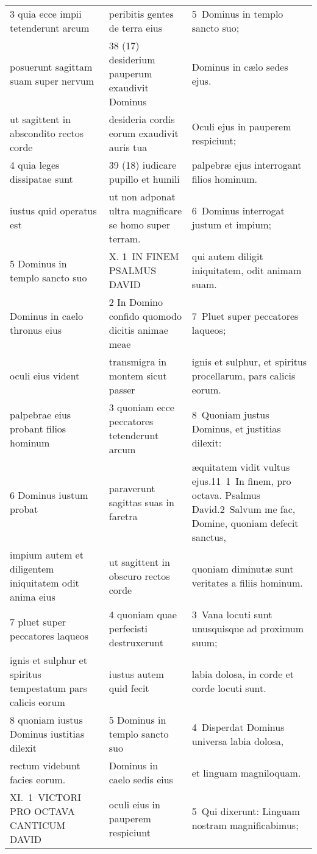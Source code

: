 \documentclass{article}
\begin{document}
\begin{longtable}{@{}p{}p{}p{}@{}}
3 quia ecce impii tetenderunt arcum	&	peribitis gentes de terra eius	&	5 Dominus in templo sancto suo;	\\
posuerunt sagittam suam super nervum	&	38 (17) desiderium pauperum exaudivit Dominus	&	Dominus in cælo sedes ejus.	\\
ut sagittent in abscondito rectos corde	&	desideria cordis eorum exaudivit auris tua	&	Oculi ejus in pauperem respiciunt;	\\
4 quia leges dissipatae sunt	&	39 (18) iudicare pupillo et humili	&	palpebræ ejus interrogant filios hominum.	\\
iustus quid operatus est	&	ut non adponat ultra magnificare se homo super terram.	&	6 Dominus interrogat justum et impium;	\\
5 Dominus in templo sancto suo	&	X. 1 IN FINEM PSALMUS DAVID	&	qui autem diligit iniquitatem, odit animam suam.	\\
Dominus in caelo thronus eius	&	2 In Domino confido quomodo dicitis animae meae	&	7 Pluet super peccatores laqueos;	\\
oculi eius vident	&	transmigra in montem sicut passer	&	ignis et sulphur, et spiritus procellarum, pars calicis eorum.	\\
palpebrae eius probant filios hominum	&	3 quoniam ecce peccatores tetenderunt arcum	&	8 Quoniam justus Dominus, et justitias dilexit:	\\
6 Dominus iustum probat	&	paraverunt sagittas suas in faretra	&	æquitatem vidit vultus ejus.11 1 In finem, pro octava. Psalmus David.2 Salvum me fac, Domine, quoniam defecit sanctus,	\\
impium autem et diligentem iniquitatem odit anima eius	&	ut sagittent in obscuro rectos corde	&	quoniam diminutæ sunt veritates a filiis hominum.	\\
7 pluet super peccatores laqueos	&	4 quoniam quae perfecisti destruxerunt	&	3 Vana locuti sunt unusquisque ad proximum suum;	\\
ignis et sulphur et spiritus tempestatum pars calicis eorum	&	iustus autem quid fecit	&	labia dolosa, in corde et corde locuti sunt.	\\
8 quoniam iustus Dominus iustitias dilexit	&	5 Dominus in templo sancto suo	&	4 Disperdat Dominus universa labia dolosa,	\\
rectum videbunt facies eorum.	&	Dominus in caelo sedis eius	&	et linguam magniloquam.	\\
XI. 1 VICTORI PRO OCTAVA CANTICUM DAVID	&	oculi eius in pauperem respiciunt	&	5 Qui dixerunt: Linguam nostram magnificabimus;	\\

\end{longtable}
\end{document}
